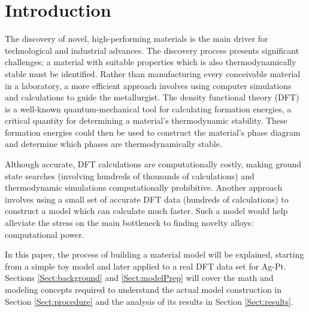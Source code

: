 \section{Introduction}\label{Sect:intro}
\par The discovery of novel, high-performing materials is the main driver for technological and industrial advances. The discovery process presents significant challenges; a material with suitable properties which is also thermodynamically stable must be identified. Rather than manufacturing every conceivable material in a laboratory, a more efficient approach involves using computer simulations and calculations to guide the metallurgist.  The density functional theory (DFT) is a well-known quantum-mechanical tool for calculating formation energies, a critical quantity for determining a material's thermodynamic stability.  These formation energies could then be used to construct the material's phase diagram and determine which phases are thermodynamically stable. 
\par Although accurate, DFT calculations are computationally costly, making ground state searches (involving hundreds of thousands of calculations) and thermodynamic simulations computationally prohibitive. Another approach involves using a small set of accurate DFT data (hundreds of calculations) to construct a model which can calculate much faster.  Such a model would help alleviate the stress on the main bottleneck to finding novelty alloys: computational power. 
\par In this paper, the process of building a material model will be explained, starting from a simple toy model and later applied to a real DFT data set for Ag-Pt.  Sections \ref{Sect:background} and \ref{Sect:modelPrep} will cover the math and modeling concepts required to understand the actual model construction in Section \ref{Sect:procedure} and the analysis of its results in Section \ref{Sect:results}. 